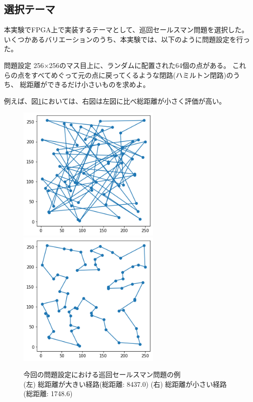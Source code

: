 \subsection*{選択テーマ}
本実験でFPGA上で実装するテーマとして、巡回セールスマン問題を選択した。
いくつかあるバリエーションのうち、本実験では、以下のように問題設定を行った。
\begin{itembox}[l]{問題設定}
    256×256のマス目上に、ランダムに配置された64個の点がある。
    これらの点をすべてめぐって元の点に戻ってくるような閉路(ハミルトン閉路)のうち、
    総距離ができるだけ小さいものを求めよ。
\end{itembox}
例えば、図\ref{fig:tspsapmle}においては、右図は左図に比べ総距離が小さく評価が高い。
\begin{figure}[h]
    \label{fig:tspsapmle}
    \begin{center}
        \includegraphics[width=7cm]{figure/tsp_bad.png}
        \includegraphics[width=7cm]{figure/tsp_good.png}
        \caption{
            今回の問題設定における巡回セールスマン問題の例\\
            (左) 総距離が大きい経路(総距離: 8437.0)
            (右) 総距離が小さい経路(総距離: 1748.6)
        }
    \end{center}
\end{figure}
